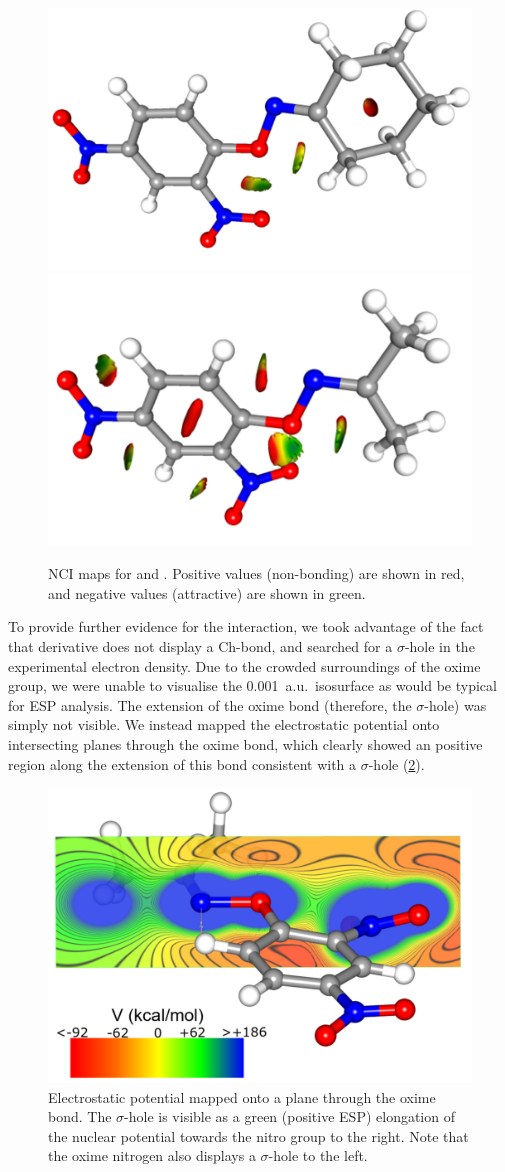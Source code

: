 \begin{refsection}
\begin{figure}
	\centering
	\includegraphics[angle=90,width=0.35\columnwidth]{Figures/cyclohexanone-oxime-dnp-nci.pdf}
	\includegraphics[angle=90,width=0.35\columnwidth]{Figures/acetone-oxime-dnp-nci.pdf}
	\caption[NCI maps for  and .]{NCI maps for  and . Positive values (non-bonding) are shown in red, and negative values (attractive) are shown in green.}\label{fig:NCI}
\end{figure}

To provide further evidence for the interaction, we took advantage of the fact that derivative  does not display a Ch-bond, and searched for a $\sigma$-hole in the experimental electron density.
Due to the crowded surroundings of the oxime group, we were unable to visualise the 0.001~a.u.\ isosurface as would be typical for ESP analysis.
The extension of the oxime bond (therefore, the $\sigma$-hole) was simply not visible.
We instead mapped the electrostatic potential onto intersecting planes through the oxime bond, which clearly showed an positive region along the extension of this bond consistent with a $\sigma$-hole (\cref{fig:acetone-esp}).

\begin{figure}
	\centering
	\includegraphics[width=0.6\columnwidth]{Figures/acetone-oxime-dnp-esp.pdf}
	\caption[Electrostatic potential mapped onto a plane through the oxime bond.]{Electrostatic potential mapped onto a plane through the oxime bond. The $\sigma$-hole is visible as a green (positive ESP) elongation of the nuclear potential towards the nitro group to the right. Note that the oxime nitrogen also displays a $\sigma$-hole to the left.}\label{fig:acetone-esp}
\end{figure}


\end{refsection}
